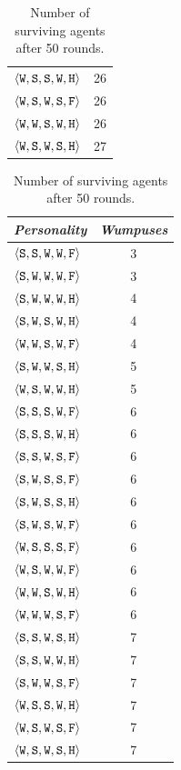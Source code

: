 \begin{table}
{{\begin{minipage}[b]{0.42\hsize}
\begin{tabular}{ l | c }
					$\personality{W}{S}{S}{W}{H}$ & 26\\
					$\personality{W}{S}{W}{S}{F}$ & 26\\
					$\personality{W}{W}{S}{W}{H}$ & 26\\
					$\personality{W}{S}{W}{S}{H}$ & 27\\
					\hline
				\end{tabular}
				\caption{Number of surviving agents after 50 rounds.}
				\label{tab:numAgents}
			\end{minipage}
			\hfill
			\begin{minipage}[b]{0.42\hsize}\centering
				\begin{tabular}{ l | c }
					\emph{Personality} & \emph{Wumpuses} \\
					\hline
					$\personality{S}{S}{W}{W}{F}$ & 3\\
					$\personality{S}{W}{W}{W}{F}$ & 3\\
					$\personality{S}{W}{W}{W}{H}$ & 4\\
					$\personality{S}{W}{S}{W}{H}$ & 4\\
					$\personality{W}{W}{S}{W}{F}$ & 4\\
					$\personality{S}{W}{W}{S}{H}$ & 5\\
					$\personality{W}{S}{W}{W}{H}$ & 5\\
					$\personality{S}{S}{S}{W}{F}$ & 6\\
					$\personality{S}{S}{S}{W}{H}$ & 6\\
					$\personality{S}{S}{W}{S}{F}$ & 6\\
					$\personality{S}{W}{S}{S}{F}$ & 6\\
					$\personality{S}{W}{S}{S}{H}$ & 6\\
					$\personality{S}{W}{S}{W}{F}$ & 6\\
					$\personality{W}{S}{S}{S}{F}$ & 6\\
					$\personality{W}{S}{W}{W}{F}$ & 6\\
					$\personality{W}{W}{S}{W}{H}$ & 6\\
					$\personality{W}{W}{W}{S}{F}$ & 6\\
					$\personality{S}{S}{W}{S}{H}$ & 7\\
					$\personality{S}{S}{W}{W}{H}$ & 7\\
					$\personality{S}{W}{W}{S}{F}$ & 7\\
					$\personality{W}{S}{S}{W}{H}$ & 7\\
					$\personality{W}{S}{W}{S}{F}$ & 7\\
					$\personality{W}{S}{W}{S}{H}$ & 7\\

\end{tabular}
\end{minipage}}}
\end{table}
